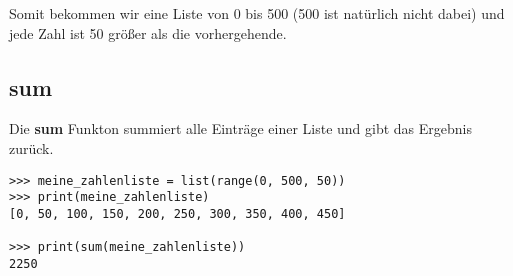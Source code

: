 Somit bekommen wir eine Liste von 0 bis 500 (500 ist natürlich nicht dabei) und jede Zahl ist 50 größer als die vorhergehende.

\subsection*{sum}

Die \textbf{sum} Funkton summiert alle Einträge einer Liste und gibt das Ergebnis zurück.


\begin{Verbatim}[frame=single]
>>> meine_zahlenliste = list(range(0, 500, 50))
>>> print(meine_zahlenliste)
[0, 50, 100, 150, 200, 250, 300, 350, 400, 450]

>>> print(sum(meine_zahlenliste))
2250
\end{Verbatim}

\newpage
